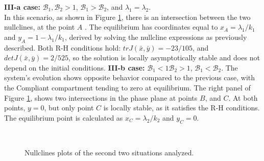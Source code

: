 \textbf{III-a case:} $\mathcal{B}_1, \mathcal{B}_2 >1$, $\mathcal{B}_1 >  \mathcal{B}_2$, and $\lambda_1 = \lambda_2$. \\
In this scenario, as shown in Figure \ref{fig:nullcline_B1_mag_B2}, there is an intersection between the two nullclines, at the point $A$ . The equilibrium has coordinates equal to $x_A = \lambda_1/k_1$ and $y_A = 1 - \lambda_1/k_1 $, derived by solving the nullcline expressions as previously described. Both R-H conditions hold: $trJ(\bar{x},\bar{y}) = -23/105$, and $detJ(\bar{x},\bar{y}) = 2/525$, so the solution is locally asymptotically stable and does not depend on the initial conditions.
\textbf{III-b case: }$\mathcal{B}_1<1 \mathcal{B}_2 >1$, $\mathcal{B}_1 <  \mathcal{B}_2$.
The system's evolution shows opposite behavior compared to the previous case, with the Compliant compartment tending to zero at equilibrium. The right panel of Figure \ref{fig:nullcline_B1_mag_B2}, shows two intersections in the phase plane at points $B$, and $C$. At both points, $y=0$, but only point $C$ is locally stable, as it satisfies the R-H conditions. The equilibrium point is calculated as $x_C= \lambda_2/k_2$ and $y_C = 0$.  
\begin{figure}[h]
	\centering
	 \quad
	 \\
	\caption[Nullclines second figure]{Nullclines plots of the second two situations analyzed.}
	\label{fig:nullcline_B1_mag_B2}
\end{figure}

